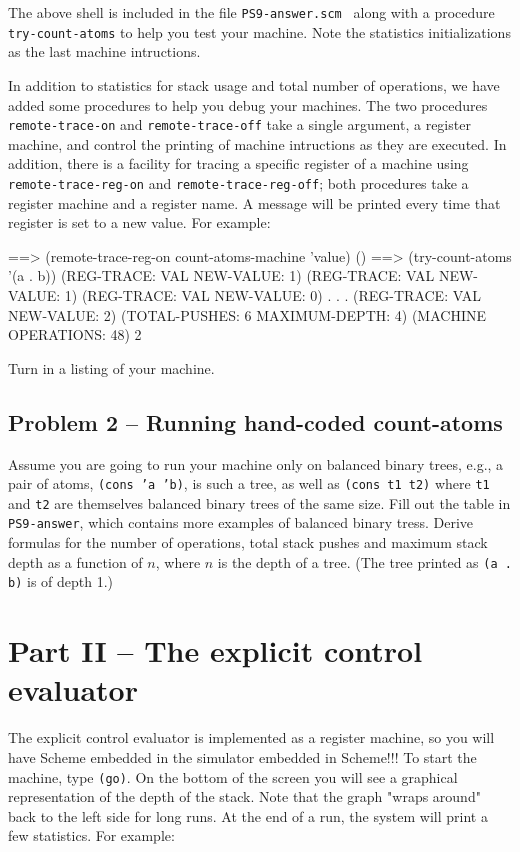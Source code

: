 The above shell is included in the file {\tt PS9-answer.scm } along
with a procedure {\tt try-count-atoms} to help you test your machine.  
Note the statistics initializations as the last machine intructions.  

In addition to statistics for stack usage and total number of operations, we 
have added some procedures to help you debug your machines.  The two 
procedures {\tt remote-trace-on} and {\tt remote-trace-off} take a single
argument, a register machine, and control the printing of machine intructions 
as they are executed.  In addition, there is a facility for tracing a specific 
register of a machine using {\tt remote-trace-reg-on} and 
{\tt remote-trace-reg-off}; both procedures take a register machine and a 
register name.  A message will be printed every time that register is set to 
a new value.  For example:

 ==> (remote-trace-reg-on count-atoms-machine 'value)
()
 ==> (try-count-atoms '(a . b))
(REG-TRACE: VAL NEW-VALUE: 1) 
(REG-TRACE: VAL NEW-VALUE: 1) 
(REG-TRACE: VAL NEW-VALUE: 0) 
        .
        .
        .
(REG-TRACE: VAL NEW-VALUE: 2) 
(TOTAL-PUSHES: 6 MAXIMUM-DEPTH: 4) 
(MACHINE OPERATIONS: 48) 
2 
\endlisp

Turn in a listing of your machine.

\section{Problem 2 -- Running hand-coded count-atoms}

Assume you are going to run your machine only on balanced binary trees,
e.g., a pair of atoms, {\tt (cons 'a 'b)}, is such a tree, as well as
{\tt (cons t1 t2)} where {\tt t1} and {\tt t2} are themselves balanced binary 
trees of the same size.  Fill out the table in {\tt PS9-answer}, which 
contains more examples of balanced binary tress.  Derive formulas for the 
number of operations, total stack pushes and maximum stack depth as a function 
of $n$, where $n$ is the depth of a tree.  (The tree printed as {\tt (a . b)} 
is of depth 1.)  


\chapter{Part II -- The explicit control evaluator}

The explicit control evaluator is implemented as a register machine,
so you will have Scheme embedded in the simulator embedded in
Scheme!!! To start the machine, type {\tt (go)}. On the bottom of the screen
you will see a graphical representation of the depth of the stack.
Note that the graph "wraps around" back to the left side for long
runs.  At the end of a run, the system will print a few statistics.
For example:

